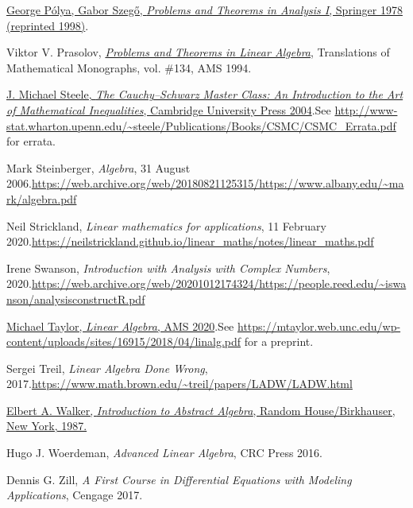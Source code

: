 \documentclass[numbers=enddot,12pt,final,onecolumn,notitlepage]{scrartcl}%
\numberwithin{exer}{subsection}
\theoremstyle{definition}
\begin{document}
\begin{thebibliography}{99999999}
%
\href{https://doi.org/10.1007/978-3-642-61983-0}{George P\'{o}lya, Gabor
Szeg\H{o}, \textit{Problems and Theorems in Analysis I}, Springer 1978
(reprinted 1998)}.

Viktor V. Prasolov,
\textit{\href{http://www2.math.su.se/~mleites/books/prasolov-1994-problems.pdf}{\textit{Problems
and Theorems in Linear Algebra}}}, Translations of Mathematical Monographs,
vol. \#134, AMS 1994.

%
\href{http://www.ma.huji.ac.il/~ehudf/courses/Ineq09/The Cauchy-Schwarz Master Class .pdf}{J.
Michael Steele, \textit{The Cauchy--Schwarz Master Class: An Introduction to
the Art of Mathematical Inequalities}, Cambridge University Press
2004}.\newline See
\url{http://www-stat.wharton.upenn.edu/~steele/Publications/Books/CSMC/CSMC_Errata.pdf}
for errata.

Mark Steinberger, \textit{Algebra}, 31 August
2006.\newline\url{https://web.archive.org/web/20180821125315/https://www.albany.edu/~mark/algebra.pdf}

Neil Strickland, \textit{Linear mathematics for
applications}, 11 February 2020.\newline\url{https://neilstrickland.github.io/linear_maths/notes/linear_maths.pdf}

Irene Swanson, \textit{Introduction with Analysis
with Complex Numbers}, 2020.\newline\url{https://web.archive.org/web/20201012174324/https://people.reed.edu/~iswanson/analysisconstructR.pdf}

%
\href{https://bookstore.ams.org/amstext-45/}{Michael Taylor, \textit{Linear
Algebra}, AMS 2020}.\newline See
\url{https://mtaylor.web.unc.edu/wp-content/uploads/sites/16915/2018/04/linalg.pdf}
for a preprint.

Sergei Treil, \textit{Linear Algebra Done Wrong},
2017.\newline\url{https://www.math.brown.edu/~treil/papers/LADW/LADW.html}

%
\href{https://web.archive.org/web/20170809055317/https://www.math.nmsu.edu/~elbert/AbsAlgeb.pdf}{Elbert
A. Walker, \textit{Introduction to Abstract Algebra}, Random House/Birkhauser,
New York, 1987.}

Hugo J. Woerdeman, \textit{Advanced Linear
Algebra}, CRC Press 2016.

Dennis G. Zill, \textit{A First Course in Differential
Equations with Modeling Applications}, Cengage 2017.
\end{thebibliography}
\end{document}
